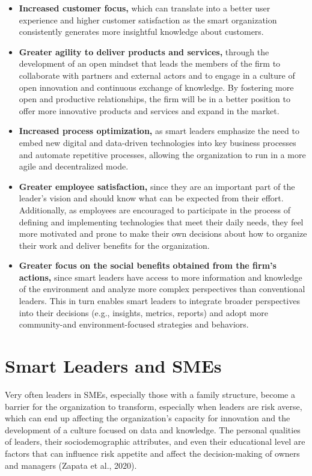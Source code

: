 \documentclass[
  letterpaper,
  DIV=11,
  numbers=noendperiod]{scrreprt}
\begin{document}
\begin{itemize}
\item
  \textbf{Increased customer focus,} which can translate into a better
  user experience and higher customer satisfaction as the smart
  organization consistently generates more insightful knowledge about
  customers.
\item
  \textbf{Greater agility to deliver products and services,} through the
  development of an open mindset that leads the members of the firm to
  collaborate with partners and external actors and to engage in a
  culture of open innovation and continuous exchange of knowledge. By
  fostering more open and productive relationships, the firm will be in
  a better position to offer more innovative products and services and
  expand in the market.
\item
  \textbf{Increased process optimization,} as smart leaders emphasize
  the need to embed new digital and data-driven technologies into key
  business processes and automate repetitive processes, allowing the
  organization to run in a more agile and decentralized mode.
\item
  \textbf{Greater employee satisfaction,} since they are an important
  part of the leader's vision and should know what can be expected from
  their effort. Additionally, as employees are encouraged to participate
  in the process of defining and implementing technologies that meet
  their daily needs, they feel more motivated and prone to make their
  own decisions about how to organize their work and deliver benefits
  for the organization.
\item
  \textbf{Greater focus on the social benefits obtained from the firm's
  actions,} since smart leaders have access to more information and
  knowledge of the environment and analyze more complex perspectives
  than conventional leaders. This in turn enables smart leaders to
  integrate broader perspectives into their decisions (e.g., insights,
  metrics, reports) and adopt more community-and environment-focused
  strategies and behaviors.
\end{itemize}

\hypertarget{smart-leaders-and-smes}{%
\section{Smart Leaders and SMEs}\label{smart-leaders-and-smes}}

Very often leaders in SMEs, especially those with a family structure,
become a barrier for the organization to transform, especially when
leaders are risk averse, which can end up affecting the organization's
capacity for innovation and the development of a culture focused on data
and knowledge. The personal qualities of leaders, their sociodemographic
attributes, and even their educational level are factors that can
influence risk appetite and affect the decision-making of owners and
managers (Zapata et al., 2020).
\end{document}
